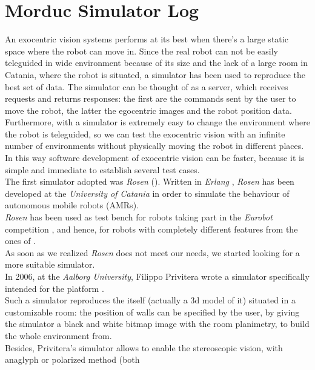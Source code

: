 \section{Morduc Simulator Log}
\label{log:morduc_simulator}

An exocentric vision systems performs at its best 
when there's a large static space where the robot can move in. Since 
the real robot can not be easily teleguided in wide 
environment because of its size and the lack of a large 
room in Catania, where the robot is situated, a simulator 
has been used to reproduce the best set of data. The 
simulator can be thought of as a server, which receives 
requests and returns responses: the first are the commands 
sent by the user to move the robot, the latter the 
egocentric images and the robot position data.
\\
Furthermore, with a simulator is extremely easy to 
change the environment where the robot is teleguided, 
so we can test the exocentric vision with an infinite 
number of environments without physically moving the 
robot in different places. In this way software 
development of exocentric vision can be faster, because 
it is simple and immediate to establish several test cases.
\\
The first simulator adopted was \textit{Rosen} (\cite{rosen}). Written in 
\textit{Erlang} \cite{erlang}, \textit{Rosen} has been developed at
the \textit{University of Catania} in order to simulate the behaviour of
autonomous mobile robots (AMRs).
\\
\textit{Rosen} has been used as test bench for robots taking part in 
the \textit{Eurobot} competition \cite{eurobot}, and hence, 
for robots with completely different features from the ones of \morduc{}. 
\\
As soon as we realized \textit{Rosen} does not meet our needs, 
we started looking for a more suitable simulator.
\\
In 2006, at the \textit{Aalborg University}, Filippo 
Privitera wrote a simulator specifically intended for 
the \morduc{} platform \cite{privitera}. 
\\
Such a simulator reproduces the \morduc{} itself (actually a 
3d model of it) situated in a customizable room: the position 
of walls can be specified by the user, by giving 
the simulator a black and white bitmap image with the room 
planimetry, to build the whole environment from. 
\\
Besides, Privitera's simulator allows to enable the 
stereoscopic vision, with anaglyph or polarized method (both 

